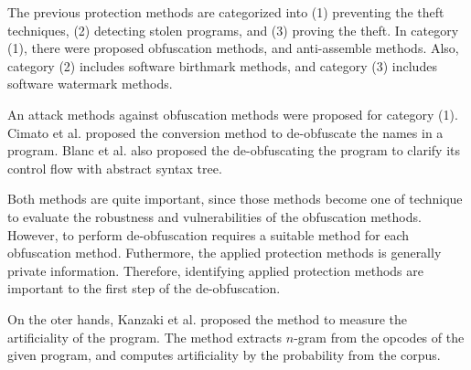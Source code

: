 \documentclass[conference]{IEEEtran}
\begin{document}
The previous protection methods are categorized into (1) preventing
the theft techniques, (2) detecting stolen programs, and (3) proving
the theft\cite{collberg09surreptitious}.
%
In category (1), there were proposed obfuscation methods, and
anti-assemble methods\cite{tyma00patent,monden97ieice}.  Also,
category (2) includes software birthmark
methods\cite{tamada05ieice}, and category (3) includes software
watermark methods\cite{collberg99popl}.

An attack methods against obfuscation methods were proposed for
category (1)\cite{cimato05jss}.
%
Cimato et al. proposed the conversion method to de-obfuscate the names
in a program.
%
Blanc et al. also proposed the de-obfuscating the program to clarify
its control flow with abstract syntax tree\cite{blanc12waina}.

Both methods are quite important, since those methods become one of
technique to evaluate the robustness and vulnerabilities of the
obfuscation methods.  However, to perform de-obfuscation requires a
suitable method for each obfuscation method.  Futhermore, the applied
protection methods is generally private information.  Therefore,
identifying applied protection methods are important to the first step
of the de-obfuscation.

On the oter hands, Kanzaki et al. proposed the method to measure the
artificiality of the program\cite{kanzaki14ipsj}. The method extracts
$n$-gram from the opcodes of the given program, and computes
artificiality by the probability from the corpus.
\end{document}
